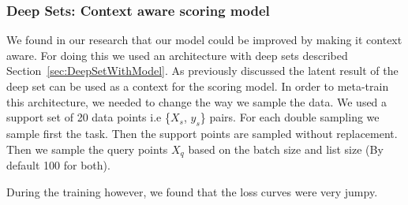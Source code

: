 \documentclass[12pt, twoside, ngerman]{report}
\begin{document}
\subsubsection{Deep Sets: Context aware scoring model}

We found in our research that our model could be improved by making it context aware.
For doing this we used an architecture with deep sets described Section~\ref{sec:DeepSetWithModel}.
As previously discussed the latent result of the deep set can be used as a context for the scoring model.
In order to meta-train this architecture,  we needed to change the way we sample the data.
We used a support set of 20 data points i.e \{$X_s$, $y_s$\} pairs.
For each double sampling we sample first the task.
Then the support points are sampled without replacement.
Then we sample the query points $X_q$ based on the batch size and list size (By default 100 for both).

During the training however,  we found that the loss curves were very jumpy.
\end{document}
